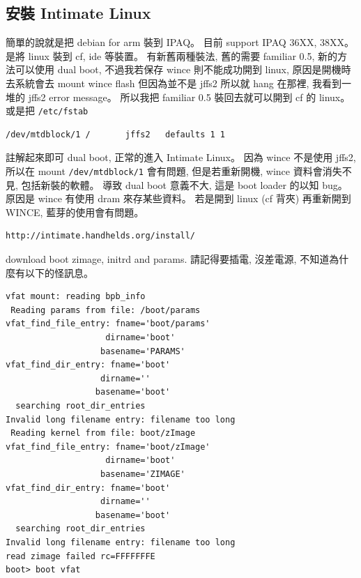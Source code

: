 \documentclass[12pt,a4paper]{article}
\begin{document}
\begin{CJK}{UTF8}{cwmu}
\section{安裝 Intimate Linux}\label{intimate}
簡單的說就是把 debian for arm 裝到 IPAQ。
目前 support IPAQ 36XX, 38XX。
是將 linux 裝到 cf, ide 等裝置。
有新舊兩種裝法, 舊的需要 familiar 0.5,
新的方法可以使用 dual boot,
不過我若保存 wince 則不能成功開到 linux,
原因是開機時去系統會去 mount wince flash 但因為並不是 jffs2 所以就 hang 在那裡,
我看到一堆的 jffs2 error message。
所以我把 familiar 0.5 裝回去就可以開到 cf 的 linux。
或是把 \verb+/etc/fstab+
\begin{verbatim}
/dev/mtdblock/1 /       jffs2   defaults 1 1
\end{verbatim}
註解起來即可 dual boot, 正常的進入 Intimate Linux。
因為 wince 不是使用 jffs2, 所以在 mount \verb+/dev/mtdblock/1+
會有問題, 但是若重新開機, wince 資料會消失不見, 包括新裝的軟體。
導致 dual boot 意義不大, 這是 boot loader 的以知 bug。
原因是 wince 有使用 dram 來存某些資料。
若是開到 linux (cf 背夾) 再重新開到 WINCE,
藍芽的使用會有問題。

\begin{verbatim}
http://intimate.handhelds.org/install/
\end{verbatim}
download boot zimage, initrd and params.
請記得要插電, 沒差電源, 不知道為什麼有以下的怪訊息。


\begin{verbatim}
vfat mount: reading bpb_info                                                    
 Reading params from file: /boot/params                                         
vfat_find_file_entry: fname='boot/params'                                       
                    dirname='boot'                                              
                   basename='PARAMS'                                            
vfat_find_dir_entry: fname='boot'                                               
                   dirname=''                                                   
                  basename='boot'                                               
  searching root_dir_entries                                                    
Invalid long filename entry: filename too long                                  
 Reading kernel from file: boot/zImage                                          
vfat_find_file_entry: fname='boot/zImage'                                       
                    dirname='boot'                                              
                   basename='ZIMAGE'                                            
vfat_find_dir_entry: fname='boot'                                               
                   dirname=''                                                   
                  basename='boot'                                               
  searching root_dir_entries                                                    
Invalid long filename entry: filename too long                                  
read zimage failed rc=FFFFFFFE                                                  
boot> boot vfat     
\end{verbatim}


\end{CJK}
\end{document}
